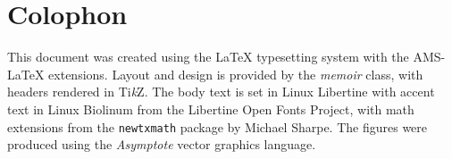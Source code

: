 \documentclass[../book/calcnotes.tex]{subfiles}
\begin{document}
\chapter{Colophon}

This document was created using the \LaTeX{} typesetting system with the AMS-\LaTeX{} extensions.
Layout and design is provided by the \textit{memoir} class, with headers rendered in Ti\textit{k}Z.
The body text is set in Linux Libertine with accent text in Linux Biolinum from the Libertine Open Fonts Project, with math extensions from the \texttt{newtxmath} package by Michael Sharpe.
The figures were produced using the \textit{Asymptote} vector graphics language.
\end{document}
